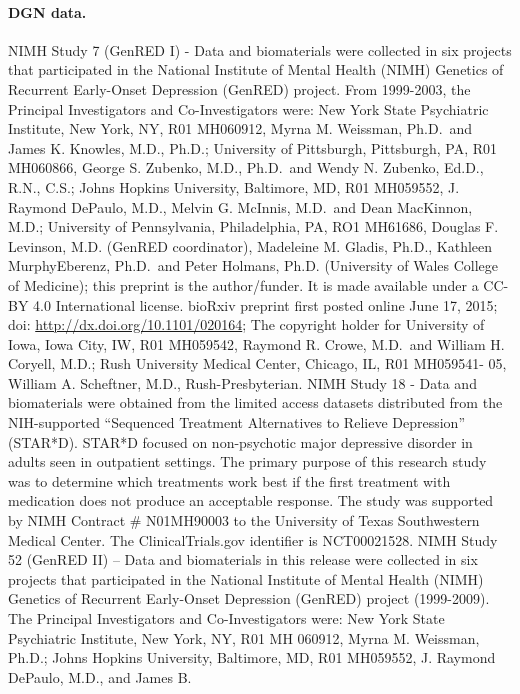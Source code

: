 \documentclass[10pt,letterpaper]{article}
\begin{document}
\paragraph{DGN data.}\label{dgn-data}

NIMH Study 7 (GenRED I) - Data and biomaterials were collected in six
projects that participated in the National Institute of Mental Health
(NIMH) Genetics of Recurrent Early-Onset Depression (GenRED) project.
From 1999-2003, the Principal Investigators and Co-Investigators were:
New York State Psychiatric Institute, New York, NY, R01 MH060912, Myrna
M. Weissman, Ph.D.~and James K. Knowles, M.D., Ph.D.; University of
Pittsburgh, Pittsburgh, PA, R01 MH060866, George S. Zubenko, M.D.,
Ph.D.~and Wendy N. Zubenko, Ed.D., R.N., C.S.; Johns Hopkins University,
Baltimore, MD, R01 MH059552, J. Raymond DePaulo, M.D., Melvin G.
McInnis, M.D.~and Dean MacKinnon, M.D.; University of Pennsylvania,
Philadelphia, PA, RO1 MH61686, Douglas F. Levinson, M.D. (GenRED
coordinator), Madeleine M. Gladis, Ph.D., Kathleen MurphyEberenz,
Ph.D.~and Peter Holmans, Ph.D. (University of Wales College of
Medicine); this preprint is the author/funder. It is made available
under a CC-BY 4.0 International license. bioRxiv preprint first posted
online June 17, 2015; doi: \url{http://dx.doi.org/10.1101/020164}; The
copyright holder for University of Iowa, Iowa City, IW, R01 MH059542,
Raymond R. Crowe, M.D.~and William H. Coryell, M.D.; Rush University
Medical Center, Chicago, IL, R01 MH059541- 05, William A. Scheftner,
M.D., Rush-Presbyterian. NIMH Study 18 - Data and biomaterials were
obtained from the limited access datasets distributed from the
NIH-supported ``Sequenced Treatment Alternatives to Relieve Depression''
(STAR*D). STAR*D focused on non-psychotic major depressive disorder in
adults seen in outpatient settings. The primary purpose of this research
study was to determine which treatments work best if the first treatment
with medication does not produce an acceptable response. The study was
supported by NIMH Contract \# N01MH90003 to the University of Texas
Southwestern Medical Center. The ClinicalTrials.gov identifier is
NCT00021528. NIMH Study 52 (GenRED II) -- Data and biomaterials in this
release were collected in six projects that participated in the National
Institute of Mental Health (NIMH) Genetics of Recurrent Early-Onset
Depression (GenRED) project (1999-2009). The Principal Investigators and
Co-Investigators were: New York State Psychiatric Institute, New York,
NY, R01 MH 060912, Myrna M. Weissman, Ph.D.; Johns Hopkins University,
Baltimore, MD, R01 MH059552, J. Raymond DePaulo, M.D., and James B.
\end{document}
